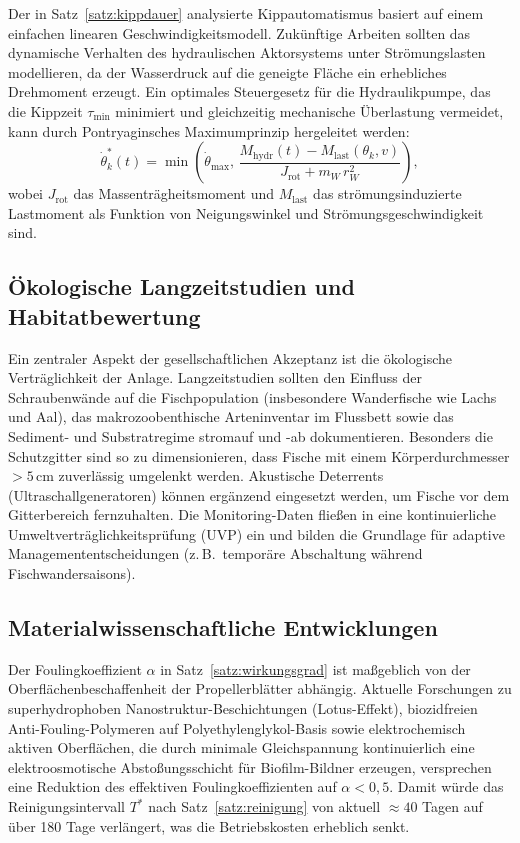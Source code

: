 ﻿\documentclass[a4paper,12pt]{article}
\theoremstyle{definition}
\begin{document}
Der in Satz~\ref{satz:kippdauer} analysierte Kippautomatismus basiert auf einem
einfachen linearen Geschwindigkeitsmodell. Zukünftige Arbeiten sollten das dynamische
Verhalten des hydraulischen Aktorsystems unter Strömungslasten modellieren, da der
Wasserdruck auf die geneigte Fläche ein erhebliches Drehmoment erzeugt. Ein
optimales Steuergesetz für die Hydraulikpumpe, das die Kippzeit $\tau_{\mathrm{min}}$
minimiert und gleichzeitig mechanische Überlastung vermeidet, kann durch
Pontryaginsches Maximumprinzip hergeleitet werden:
\[
  \dot{\theta}_k^*(t) = \min\!\left(\dot{\theta}_{\max},\,
  \frac{M_{\mathrm{hydr}}(t) - M_{\mathrm{last}}(\theta_k, v)}
  {J_{\mathrm{rot}} + m_W\,r_W^2}\right),
\]
wobei $J_{\mathrm{rot}}$ das Massenträgheitsmoment und $M_{\mathrm{last}}$ das
strömungsinduzierte Lastmoment als Funktion von Neigungswinkel und Strömungsgeschwindigkeit sind.

\subsection{Ökologische Langzeitstudien und Habitatbewertung}

Ein zentraler Aspekt der gesellschaftlichen Akzeptanz ist die ökologische
Verträglichkeit der Anlage. Langzeitstudien sollten den Einfluss der Schraubenwände
auf die Fischpopulation (insbesondere Wanderfische wie Lachs und Aal), das
makrozoobenthische Arteninventar im Flussbett sowie das Sediment- und Substratregime
stromauf und -ab dokumentieren. Besonders die Schutzgitter sind so zu dimensionieren,
dass Fische mit einem Körperdurchmesser $> 5\,\mathrm{cm}$ zuverlässig umgelenkt
werden. Akustische Deterrents (Ultraschallgeneratoren) können ergänzend eingesetzt
werden, um Fische vor dem Gitterbereich fernzuhalten. Die Monitoring-Daten fließen
in eine kontinuierliche Umweltverträglichkeitsprüfung (UVP) ein und bilden die
Grundlage für adaptive Managemententscheidungen (z.\,B.\ temporäre Abschaltung
während Fischwandersaisons).

\subsection{Materialwissenschaftliche Entwicklungen}

Der Foulingkoeffizient $\alpha$ in Satz~\ref{satz:wirkungsgrad} ist maßgeblich von
der Oberflächenbeschaffenheit der Propellerblätter abhängig. Aktuelle Forschungen
zu superhydrophoben Nanostruktur-Beschichtungen (Lotus-Effekt), biozidfreien
Anti-Fouling-Polymeren auf Polyethylenglykol-Basis sowie elektrochemisch aktiven
Oberflächen, die durch minimale Gleichspannung kontinuierlich eine elektroosmotische
Abstoßungsschicht für Biofilm-Bildner erzeugen, versprechen eine Reduktion des
effektiven Foulingkoeffizienten auf $\alpha < 0{,}5$. Damit würde das Reinigungsintervall
$T^*$ nach Satz~\ref{satz:reinigung} von aktuell $\approx 40$ Tagen auf über
180 Tage verlängert, was die Betriebskosten erheblich senkt.
\end{document}
